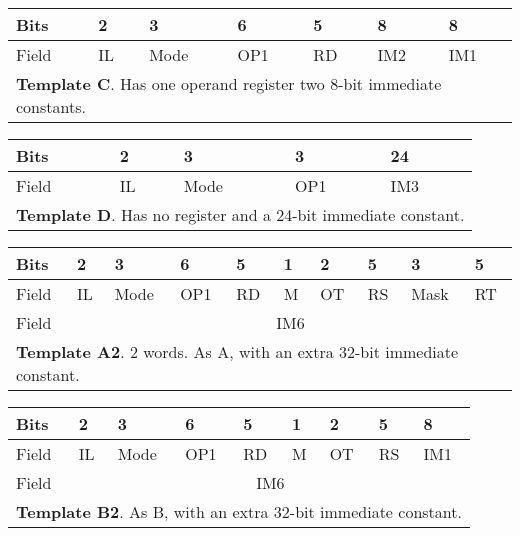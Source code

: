 \documentclass[forwardcom.tex]{subfiles}
\begin{document}
\begin{table}[h!] \label{table:templateC}
\vv
\begin{tabular}{|p{10mm}|p{10mm}|p{10mm}|p{10mm}|p{10mm}|p{38.5mm}|p{24mm}|} \hline
 Bits & 2 & 3 & 6 & 5 & \hspace{15mm} 8 & \hspace{8mm} 8 \\ \hline
Field & IL & Mode & OP1 & RD & \hspace{14mm} IM2 & \hspace{7mm} IM1 \\ \hline
\multicolumn{7}{|l|}{
\textbf{Template C}. Has one operand register two 8-bit immediate constants.} \\ \hline
\end{tabular}
\end{table}
\vv

\begin{table}[h!] \label{table:templateD}
\vv
\begin{tabular}{|p{10mm}|p{10mm}|p{10mm}|p{10mm}|p{81.5mm}|} \hline
 Bits & 2 & 3 & 3 & \hspace{33mm} 24 \\ \hline
Field & IL & Mode & OP1 & \hspace{32mm} IM3 \\ \hline
\multicolumn{5}{|l|}{
\textbf{Template D}. Has no register and a 24-bit immediate constant.
} \\ \hline
\end{tabular}
\end{table}
\vv

\begin{table}[h!] \label{table:templateA2}
\vv
\begin{tabular}{|p{10mm}|p{10mm}|p{10mm}|p{10mm}|p{10mm}|p{10mm}|p{10mm}|p{10mm}|p{10mm}|p{10mm}|} \hline
 Bits & 2 & 3 & 6 & 5 & 1 & 2 & 5 & 3 & 5 \\ \hline
Field & IL & Mode & OP1 & RD & M & OT & RS & Mask & RT  \\ \hline
Field & \multicolumn{9}{|c|}{ IM6 } \\ \hline
\multicolumn{10}{|l|}{
\textbf{Template A2}. 2 words. As A, with an extra 32-bit immediate constant.
} \\ \hline
\end{tabular}
\end{table}
\vv

\begin{table}[h!] \label{table:templateB2}
\vv
\begin{tabular}{|p{10mm}|p{10mm}|p{10mm}|p{10mm}|p{10mm}|p{10mm}|p{10mm}|p{10mm}|p{24mm}|} \hline
 Bits & 2 & 3 & 6 & 5 & 1 & 2 & 5 & 8 \\ \hline
Field & IL & Mode & OP1 & RD & M & OT & RS & IM1 \\ \hline
Field & \multicolumn{8}{|c|}{ IM6 } \\ \hline
\multicolumn{9}{|l|}{
\textbf{Template B2}. As B, with an extra 32-bit immediate constant.} \\ \hline
\end{tabular}
\end{table}
\vv
\end{document}
